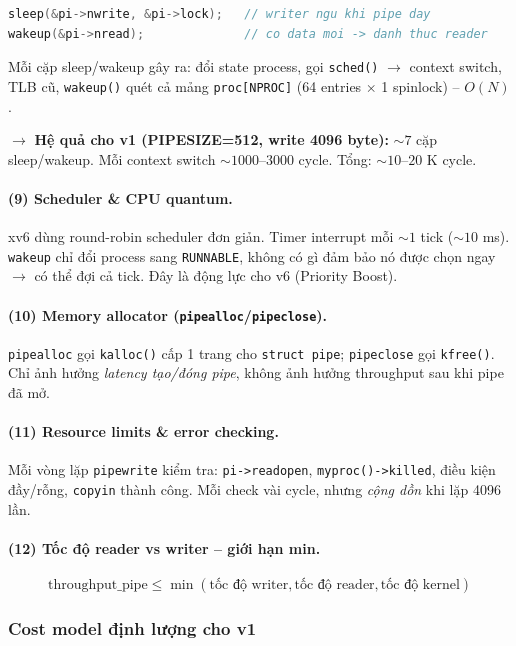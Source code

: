 \documentclass[11pt,a4paper]{article}
\begin{document}
\begin{lstlisting}[language=C]
sleep(&pi->nwrite, &pi->lock);   // writer ngu khi pipe day
wakeup(&pi->nread);              // co data moi -> danh thuc reader
\end{lstlisting}

Mỗi cặp sleep/wakeup gây ra: đổi state process, gọi \texttt{sched()} $\rightarrow$ context switch, TLB cũ, \texttt{wakeup()} quét cả mảng \texttt{proc[NPROC]} (64 entries $\times$ 1 spinlock) -- $O(N)$.

$\rightarrow$ \textbf{Hệ quả cho v1 (PIPESIZE=512, write 4096 byte):} $\sim 7$ cặp sleep/wakeup. Mỗi context switch $\sim 1000$--$3000$ cycle. Tổng: $\sim 10$--$20$ K cycle.

\paragraph{(9) Scheduler \& CPU quantum.}
xv6 dùng round-robin scheduler đơn giản. Timer interrupt mỗi $\sim 1$ tick ($\sim 10$ ms). \texttt{wakeup} chỉ đổi process sang \texttt{RUNNABLE}, không có gì đảm bảo nó được chọn ngay $\rightarrow$ có thể đợi cả tick. Đây là động lực cho v6 (Priority Boost).

\paragraph{(10) Memory allocator (\texttt{pipealloc}/\texttt{pipeclose}).}
\texttt{pipealloc} gọi \texttt{kalloc()} cấp 1 trang cho \texttt{struct pipe}; \texttt{pipeclose} gọi \texttt{kfree()}. Chỉ ảnh hưởng \emph{latency tạo/đóng pipe}, không ảnh hưởng throughput sau khi pipe đã mở.

\paragraph{(11) Resource limits \& error checking.}
Mỗi vòng lặp \texttt{pipewrite} kiểm tra: \texttt{pi->readopen}, \texttt{myproc()->killed}, điều kiện đầy/rỗng, \texttt{copyin} thành công. Mỗi check vài cycle, nhưng \emph{cộng dồn} khi lặp 4096 lần.

\paragraph{(12) Tốc độ reader vs writer -- giới hạn min.}
\[ \text{throughput\_pipe} \leq \min(\text{tốc độ writer}, \text{tốc độ reader}, \text{tốc độ kernel}) \]

\subsubsection{Cost model định lượng cho v1}
\end{document}
